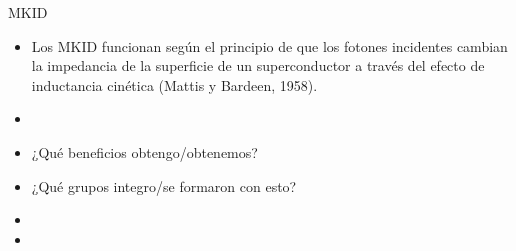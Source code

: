 \documentclass[ignorenonframetext,12pt]{beamer}
\begin{document}
\begin{frame}{MKID}
				\begin{itemize}
								\item Los MKID funcionan según el principio de que los fotones
												incidentes \alert{cambian la impedancia de la superficie de un
												superconductor a través del efecto de inductancia
												cinética} (Mattis y Bardeen, 1958).
								\item 
								\item ¿Qué beneficios obtengo/obtenemos?
								\item ¿Qué grupos integro/se formaron con esto?
								\item 
								\item 
				\end{itemize}

\end{frame}
\end{document}
